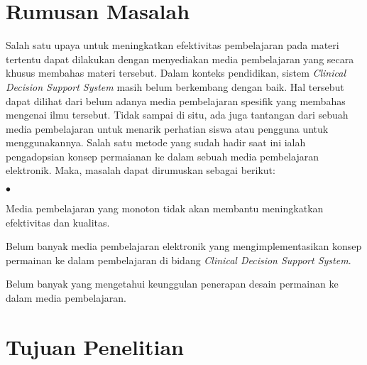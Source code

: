 
\newpage
\section{Rumusan Masalah}
Salah satu upaya untuk meningkatkan efektivitas pembelajaran pada materi tertentu dapat dilakukan dengan menyediakan media pembelajaran yang secara khusus membahas materi tersebut.
Dalam konteks pendidikan, sistem \textit{Clinical Decision Support System} masih belum berkembang dengan baik.
Hal tersebut dapat dilihat dari belum adanya media pembelajaran spesifik yang membahas mengenai ilmu tersebut.
Tidak sampai di situ, ada juga tantangan dari sebuah media pembelajaran untuk menarik perhatian siswa atau pengguna untuk menggunakannya.
Salah satu metode yang sudah hadir saat ini ialah pengadopsian konsep permaianan ke dalam sebuah media pembelajaran elektronik. 
Maka, masalah dapat dirumuskan sebagai berikut:
\begin{list}{\small$\bullet$}{}
	\item Media pembelajaran yang monoton tidak akan membantu meningkatkan efektivitas dan kualitas.
	\item Belum banyak media pembelajaran elektronik yang mengimplementasikan konsep permainan ke dalam pembelajaran di bidang \textit{Clinical Decision Support System}.
	\item Belum banyak yang mengetahui keunggulan penerapan desain permainan ke dalam media pembelajaran.
\end{list}



\section{Tujuan Penelitian}

